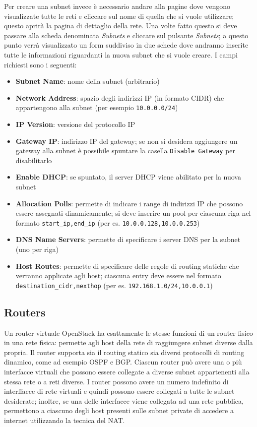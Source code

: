 Per creare una subnet invece è necessario andare alla pagine dove vengono visualizzate tutte le reti e cliccare sul nome di quella che si vuole utilizzare; questo aprirà la pagina di dettaglio della rete. Una volte fatto questo si deve passare alla scheda denominata \textit{Subnets} e cliccare sul pulsante \textit{Subnets}; a questo punto verrà visualizzato un form suddiviso in due schede dove andranno inserite tutte le informazioni riguardanti la nuova subnet che si vuole creare. I campi richiesti sono i seguenti:
\begin{itemize}
    \item \textbf{Subnet Name}: nome della subnet (arbitrario)
    \item \textbf{Network Address}: spazio degli indirizzi IP (in formato CIDR) che appartengono alla subnet (per esempio \texttt{10.0.0.0/24})
    \item \textbf{IP Version}: versione del protocollo IP
    \item \textbf{Gateway IP}: indirizzo IP del gateway; se non si desidera aggiungere un gateway alla subnet è possibile spuntare la casella \texttt{Disable Gateway} per disabilitarlo
    \item \textbf{Enable DHCP}: se spuntato, il server DHCP viene abilitato per la nuova subnet
    \item \textbf{Allocation Polls}: permette di indicare i range di indirizzi IP che possono essere assegnati dinamicamente; si deve inserire un pool per ciascuna riga nel formato \texttt{start\_ip,end\_ip} (per es. \texttt{10.0.0.128,10.0.0.253})
    \item \textbf{DNS Name Servers}: permette di specificare i server DNS per la subnet (uno per riga)
    \item \textbf{Host Routes}: permette di specificare delle regole di routing statiche che verranno applicate agli host; ciascuna entry deve essere nel formato \texttt{destination\_cidr,nexthop} (per es. \texttt{192.168.1.0/24,10.0.0.1})
\end{itemize}

\subsection{Routers}

Un router virtuale OpenStack ha esattamente le stesse funzioni di un router fisico in una rete fisica: permette agli host della rete di raggiungere subnet diverse dalla propria. Il router supporta sia il routing statico sia diversi protocolli di routing dinamico, come ad esempio OSPF e BGP. Ciascun router può avere una o più interfacce virtuali che possono essere collegate a diverse subnet appartenenti alla stessa rete o a reti diverse. I router possono avere un numero indefinito di interffacce di rete virtuali e quindi possono essere collegati a tutte le subnet desiderate; inoltre, se una delle interfacce viene collegata ad una rete pubblica, permettono a ciascuno degli host presenti sulle subnet private di accedere a internet utilizzando la tecnica del NAT.

